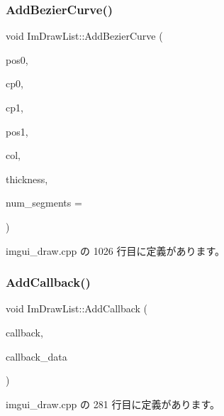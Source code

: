 \subsubsection{\texorpdfstring{Add\+Bezier\+Curve()}{AddBezierCurve()}}
{\footnotesize\ttfamily void Im\+Draw\+List\+::\+Add\+Bezier\+Curve (\begin{DoxyParamCaption}\item[{const \mbox{\hyperlink{struct_im_vec2}{Im\+Vec2}} \&}]{pos0,  }\item[{const \mbox{\hyperlink{struct_im_vec2}{Im\+Vec2}} \&}]{cp0,  }\item[{const \mbox{\hyperlink{struct_im_vec2}{Im\+Vec2}} \&}]{cp1,  }\item[{const \mbox{\hyperlink{struct_im_vec2}{Im\+Vec2}} \&}]{pos1,  }\item[{\mbox{\hyperlink{imgui_8h_a118cff4eeb8d00e7d07ce3d6460eed36}{Im\+U32}}}]{col,  }\item[{float}]{thickness,  }\item[{int}]{num\+\_\+segments = {} }\end{DoxyParamCaption})}



 imgui\+\_\+draw.\+cpp の 1026 行目に定義があります。

\mbox{\label{struct_im_draw_list_a14073d60ef9db9dc663dc7717a4893a5}} 
\subsubsection{\texorpdfstring{Add\+Callback()}{AddCallback()}}
{\footnotesize\ttfamily void Im\+Draw\+List\+::\+Add\+Callback (\begin{DoxyParamCaption}\item[{\mbox{\hyperlink{imgui_8h_a232a477233f9e3ab7640720bf94674de}{Im\+Draw\+Callback}}}]{callback,  }\item[{void $\ast$}]{callback\+\_\+data }\end{DoxyParamCaption})}



 imgui\+\_\+draw.\+cpp の 281 行目に定義があります。

\mbox{\label{struct_im_draw_list_a26c34a87eca6aefa02ca4e4951dcd170}} 
